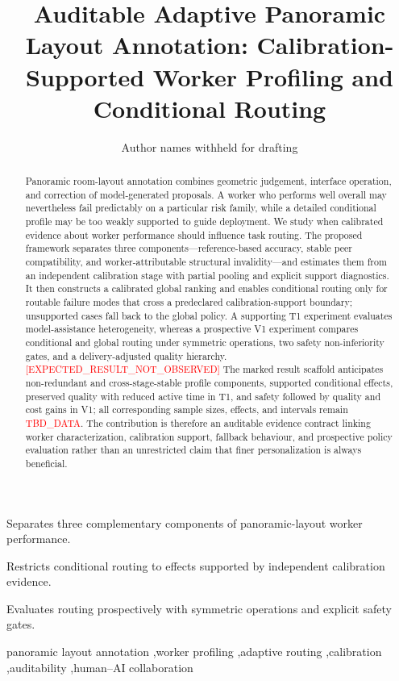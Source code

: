 \documentclass[preprint,12pt]{elsarticle}
\newcommand{\expectedresult}{\textcolor{red}{[EXPECTED\_RESULT\_NOT\_OBSERVED]}}
\newcommand{\tbddata}{\textcolor{red}{TBD\_DATA}}
\begin{document}
\begin{frontmatter}

\title{Auditable Adaptive Panoramic Layout Annotation: Calibration-Supported Worker Profiling and Conditional Routing}

\author[inst1]{Author names withheld for drafting}
\address[inst1]{Affiliation withheld for drafting}

\begin{abstract}
Panoramic room-layout annotation combines geometric judgement, interface operation, and correction of model-generated proposals. A worker who performs well overall may nevertheless fail predictably on a particular risk family, while a detailed conditional profile may be too weakly supported to guide deployment. We study when calibrated evidence about worker performance should influence task routing. The proposed framework separates three components---reference-based accuracy, stable peer compatibility, and worker-attributable structural invalidity---and estimates them from an independent calibration stage with partial pooling and explicit support diagnostics. It then constructs a calibrated global ranking and enables conditional routing only for routable failure modes that cross a predeclared calibration-support boundary; unsupported cases fall back to the global policy. A supporting T1 experiment evaluates model-assistance heterogeneity, whereas a prospective V1 experiment compares conditional and global routing under symmetric operations, two safety non-inferiority gates, and a delivery-adjusted quality hierarchy. \expectedresult{} The marked result scaffold anticipates non-redundant and cross-stage-stable profile components, supported conditional effects, preserved quality with reduced active time in T1, and safety followed by quality and cost gains in V1; all corresponding sample sizes, effects, and intervals remain \tbddata{}. The contribution is therefore an auditable evidence contract linking worker characterization, calibration support, fallback behaviour, and prospective policy evaluation rather than an unrestricted claim that finer personalization is always beneficial.
\end{abstract}

\begin{highlights}
\item Separates three complementary components of panoramic-layout worker performance.
\item Restricts conditional routing to effects supported by independent calibration evidence.
\item Evaluates routing prospectively with symmetric operations and explicit safety gates.
\end{highlights}

\begin{keyword}
panoramic layout annotation \sep worker profiling \sep adaptive routing \sep calibration \sep auditability \sep human--AI collaboration
\end{keyword}

\end{frontmatter}
\end{document}
